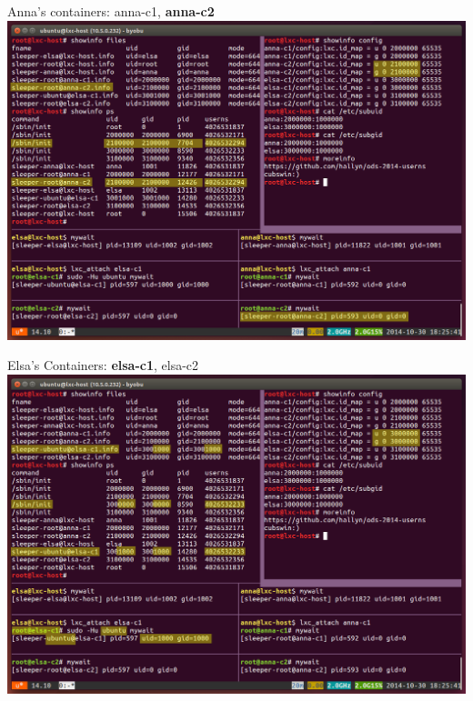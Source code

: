 \documentclass{beamer}
\begin{document}
\begin{frame}
Anna's containers: anna-c1, \textbf{anna-c2}
\includegraphics[width=\textwidth]{screen-anna-c2.png}
\end{frame}

\begin{frame}
Elsa's Containers: \textbf{elsa-c1}, elsa-c2
\includegraphics[width=\textwidth]{screen-elsa-c1.png}
\end{frame}
\end{document}
